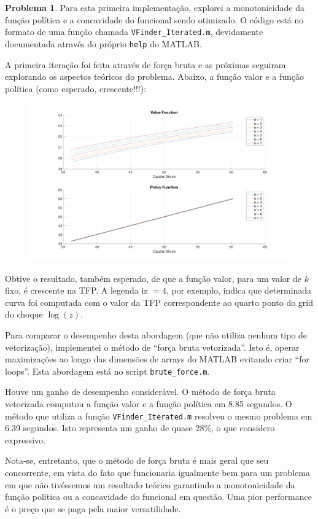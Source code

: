 \documentclass[11pt]{article}
\theoremstyle{definition}
\theoremstyle{definition}
\newtheorem{problema}{Problema}
\theoremstyle{solution}
\begin{document}
\begin{problema}
	Para esta primeira implementação, explorei a monotonicidade da função política e a concavidade do funcional sendo otimizado. O código está no formato de uma função chamada \texttt{VFinder\_Iterated.m}, devidamente documentada através do próprio \texttt{help} do MATLAB.
	
	A primeira iteração foi feita através de força bruta e as próximas seguiram explorando os aspectos teóricos do problema. Abaixo, a função valor e a função política (como esperado, crescente!!!):
	\begin{figure}[htb!]
		\centering
		\includegraphics[scale = 0.22]{problem3_V_vs_G}
	\end{figure}
	
	Obtive o resultado, também esperado, de que a função valor, para um valor de $k$ fixo, é crescente na TFP. A legenda iz $= 4$, por exemplo, indica que determinada curva foi computada com o valor da TFP correspondente ao quarto ponto do grid do choque $\log (z)$.
	
	Para comparar o desempenho desta abordagem (que não utiliza nenhum tipo de vetorização), implementei o método de ``força bruta vetorizada''. Isto é, operar maximizações ao longo das dimensões de arrays do MATLAB evitando criar ``for loops''. Esta abordagem está no script \texttt{brute\_force.m}.
	
	Houve um ganho de desempenho considerável. O método de força bruta vetorizada computou a função valor e a função política em 8.85 segundos. O método que utiliza a função \texttt{VFinder\_Iterated.m} resolveu o mesmo problema em 6.39 segundos. Isto representa um ganho de quase 28\%, o que considero expressivo. 
	
	Nota-se, entretanto, que o método de força bruta é mais geral que seu concorrente, em vista do fato que funcionaria igualmente bem para um problema em que não tivéssemos um resultado teórico garantindo a monotonicidade da função política ou a concavidade do funcional em questão. Uma pior performance é o preço que se paga pela maior versatilidade.

	
	\end{problema}
\end{document}
